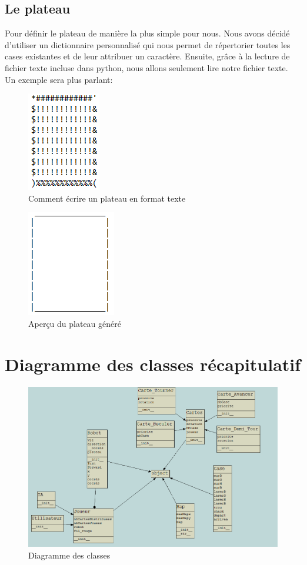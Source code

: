 \documentclass[a4paper,12pt]{report}
\begin{document}
		\subsection{Le plateau}
		
Pour définir le plateau de manière la plus simple pour nous. Nous avons décidé d'utiliser un dictionnaire personnalisé qui nous permet de répertorier toutes les cases existantes et de leur attribuer un caractère. Ensuite, grâce à la lecture de fichier texte incluse dans python, nous allons seulement lire notre fichier texte. Un exemple sera plus parlant:


\begin{figure}
\center
\includegraphics{Images/ImagePlateau}
\caption{Comment écrire un plateau en format texte}
\end{figure}

\begin{figure}
\center
\includegraphics{Images/ImagePlateauReel}
\caption{Aperçu du plateau généré}
\end{figure}

\newpage
	\section{Diagramme des classes récapitulatif}
	
\begin{figure}[!ht]
\center
\includegraphics[scale = 0.6]{Images/DiagClasse}
\caption{Diagramme des classes}

\end{figure}	
\end{document}
